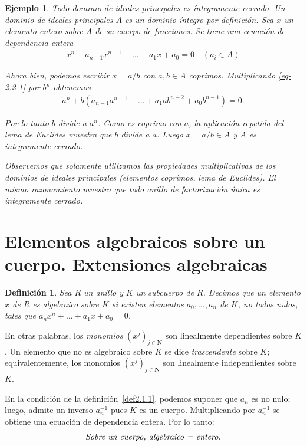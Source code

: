 \documentclass[oneside,bibtotoc,leqno,spanish]{amsbook}
\newcommand{\NN}{\mathbf{N}}
\numberwithin{equation}{section}
\newenvironment{comm}%
	{\begin{trivlist}\item\small\itshape}
	{\end{trivlist}}
\theoremstyle{defi}
\newtheorem*{definition*}{Definici\'on}
\theoremstyle{note}
\theoremstyle{rem}
\newtheorem{example}{Ejemplo}
\numberwithin{theorem}{section}
\numberwithin{proposition}{section}
\numberwithin{definition}{section}
\numberwithin{lemma}{section}
\numberwithin{corollary}{section}
\numberwithin{example}{section}
\numberwithin{footnote}{section}%
\begin{document}
\begin{example}{\itshape Todo dominio de ideales principales es \'integramente cerrado.}
Un dominio de ideales principales $A$ es un dominio \'integro por definici\'on. Sea $x$
un elemento entero sobre $A$ de su cuerpo de fracciones. Se tiene una ecuaci\'on de dependencia
entera
\begin{gather}\label{eq-2.2-1}
x^{n}+a_{n-1}x^{n-1}+\dots+a_{1}x+a_{0}=0\quad(a_{i}\in A)
\end{gather}

Ahora bien, podemos escribir $x = a/b$ con $a,b\in A$ {\em coprimos.} Multiplicando \eqref{eq-2.2-1}
por $b^{n}$ obtenemos
\begin{gather*}
a^{n}+b(a_{n-1}a^{n-1}+\dots+a_{1}ab^{n-2}+a_{0}b^{n-1}) = 0.
\end{gather*}

Por lo tanto $b$ divide a $a^{n}$. Como es coprimo con $a$, la aplicaci\'on repetida del lema de Euclides
muestra que $b$ divide a $a$. Luego $x = a/b\in A$ y $A$ es \'integramente cerrado.
\end{example}

\begin{comm}
Observemos que solamente utilizamos las propiedades multiplicativas de los dominios de ideales principales
(elementos coprimos, lema de Euclides). El mismo razonamiento muestra que todo anillo de {\em factorizaci\'on
\'unica} es \'integramente cerrado.
\end{comm}

\section{Elementos algebraicos sobre un cuerpo. Extensiones algebraicas}
\label{sec2.3}

\begin{definition*}
Sea $R$ un anillo y $K$ un subcuerpo de $R$. Decimos que un elemento $x$ de $R$ es \emph{algebraico sobre $K$} si
existen elementos $a_{0},\dots,a_{n}$ de $K$, no todos nulos, tales que $a_{n}x^{n}+\dots+a_{1}x+a_{0}=0$.
\end{definition*}

En otras palabras, los {\em monomios} $(x^{j})_{j\in\NN}$ son linealmente dependientes sobre $K$.
Un elemento que no es algebraico sobre $K$ se dice {\em trascendente} sobre $K$; equivalentemente, los
monomios $(x^{j})_{j\in\NN}$ son linealmente independientes sobre $K$.

En la condici\'on de la definici\'on~\ref{def2.1.1},
podemos suponer que $a_{n}$ es no nulo; luego, admite un inverso
$a_{n}^{-1}$ pues $K$ es un cuerpo. Multiplicando por $a_{n}^{-1}$ se obtiene una
ecuaci\'on de dependencia entera. Por lo tanto:
\begin{gather}
\text{\itshape Sobre un cuerpo, algebraico = entero.}
\end{gather}
\end{document}
